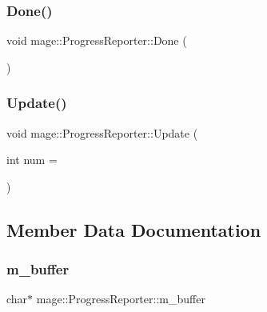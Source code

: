 \subsubsection{\texorpdfstring{Done()}{Done()}}
{\footnotesize\ttfamily void mage\+::\+Progress\+Reporter\+::\+Done (\begin{DoxyParamCaption}{ }\end{DoxyParamCaption})}

\hypertarget{classmage_1_1_progress_reporter_ae865c4bb647c14dad318ea34f6933f1d}{}\label{classmage_1_1_progress_reporter_ae865c4bb647c14dad318ea34f6933f1d} 
\subsubsection{\texorpdfstring{Update()}{Update()}}
{\footnotesize\ttfamily void mage\+::\+Progress\+Reporter\+::\+Update (\begin{DoxyParamCaption}\item[{int}]{num = {} }\end{DoxyParamCaption})}



\subsection{Member Data Documentation}
\hypertarget{classmage_1_1_progress_reporter_a3aa49d5b886263402d9a9ecb4851670c}{}\label{classmage_1_1_progress_reporter_a3aa49d5b886263402d9a9ecb4851670c} 
\subsubsection{\texorpdfstring{m\+\_\+buffer}{m\_buffer}}
{\footnotesize\ttfamily char$\ast$ mage\+::\+Progress\+Reporter\+::m\+\_\+buffer\hspace{0.3cm}{\ttfamily [private]}}

\hypertarget{classmage_1_1_progress_reporter_a93faeed07adf849e7351c85f06f2b4a7}{}\label{classmage_1_1_progress_reporter_a93faeed07adf849e7351c85f06f2b4a7} 
